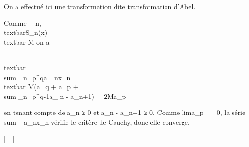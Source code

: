 \documentclass[]{article}
\begin{document}
On a effectué ici une transformation dite transformation d'Abel.

Comme \forall~~n,
\\textbar{}S\_n(x)\\textbar{} \leq M
on a

\\textbar{}\\sum
\_n=p^qa\_
nx\_n\\textbar{} \leq
M(\textbar{}a\_q\textbar{} + \textbar{}a\_p\textbar{}
+ \\sum
\_n=p^q-1\textbar{}a\_ n -
a\_n+1\textbar{}) = 2Ma\_p

en tenant compte de a\_n ≥ 0 et a\_n - a\_n+1 ≥
0. Comme lima\_p~ = 0, la série
\\sum ~
a\_nx\_n vérifie le critère de Cauchy, donc elle
converge.

{[}
{[}
{[}
{[}
\end{document}
